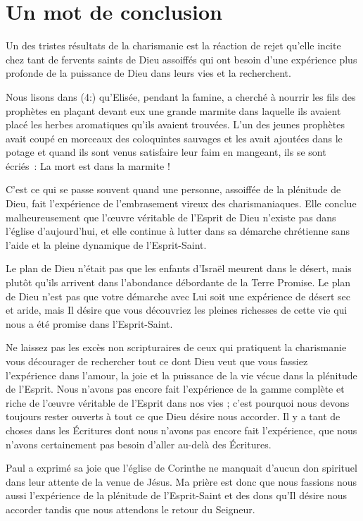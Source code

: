 \chapter{Un mot de conclusion}

Un des tristes résultats de la charismanie est la réaction de rejet
 qu'elle incite chez tant de fervents saints de Dieu assoiffés
 qui ont besoin d'une expérience plus profonde de la puissance de Dieu
 dans leurs vies et la recherchent.

Nous lisons dans (4:) qu'Elisée, pendant la famine,
 a cherché à nourrir les fils des prophètes en plaçant devant eux
 une grande marmite dans laquelle ils avaient placé les herbes
 aromatiques qu'ils avaient trouvées.
 L'un des jeunes prophètes avait coupé en morceaux des coloquintes
 sauvages et les avait ajoutées dans le potage et quand ils sont venus
 satisfaire leur faim en mangeant, ils se sont écriés~:
 \og La mort est dans la marmite ! \fg{}

C'est ce qui se passe souvent quand une personne,
 assoiffée de la plénitude de Dieu, fait l'expérience de l'embrasement
 vireux des charismaniaques. Elle conclue malheureusement
 que l'œuvre véritable de l'Esprit de Dieu n'existe pas
 dans l'église d'aujourd'hui, et elle continue à lutter
 dans sa démarche chrétienne sans l'aide et la pleine dynamique
 de l'Esprit-Saint.

Le plan de Dieu n'était pas que les enfants d'Israël meurent
 dans le désert, mais plutôt qu'ils arrivent dans l'abondance débordante
 de la Terre Promise. Le plan de Dieu n'est pas que votre démarche
 avec Lui soit une expérience de désert sec et aride, mais Il désire
 que vous découvriez les pleines richesses de cette vie
 qui nous a été promise dans l'Esprit-Saint.

Ne laissez pas les excès non scripturaires de ceux qui pratiquent 
la charismanie vous décourager de rechercher tout ce dont Dieu
 veut que vous fassiez l'expérience dans l'amour,
 la joie et la puissance de la vie vécue dans la plénitude de l'Esprit.
 Nous n'avons pas encore fait l'expérience de la gamme complète
 et riche de l'œuvre véritable de l'Esprit dans nos vies ;
 c'est pourquoi nous devons toujours rester ouverts
 à tout ce que Dieu désire nous accorder.
 Il y a tant de choses dans les Écritures dont nous n'avons pas encore
 fait l'expérience, que nous n'avons certainement pas besoin
 d'aller au-delà des Écritures.

Paul a exprimé sa joie que l'église de Corinthe ne manquait
 d'aucun don spirituel dans leur attente de la venue de Jésus.
 Ma prière est donc que nous fassions nous aussi l'expérience
 de la plénitude de l'Esprit-Saint et des dons qu'Il désire
 nous accorder tandis que nous attendons le retour du Seigneur.
\closechapter


